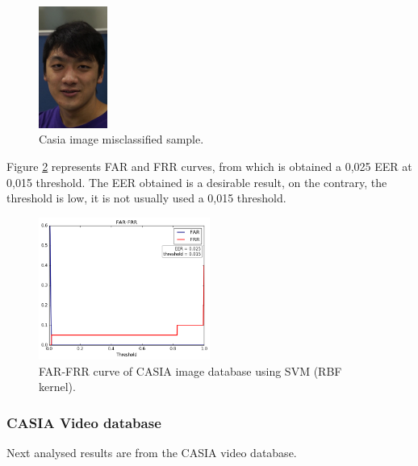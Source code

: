 \begin{figure}[htb]
\centering
\includegraphics[width=0.2\textwidth]{images_databases/casia_real_41.jpg}
\caption{Casia image misclassified sample.} \label{fig:casia_im_miscl}
\end{figure}

Figure \ref{fig:CASIA_im_FAR_FRR} represents  FAR and FRR curves, from which is obtained a 0,025 EER at 0,015 threshold. The EER obtained is a desirable result, on the contrary, the threshold is low, it is not usually used a 0,015 threshold.

\begin{figure}[htb]
\centering
\includegraphics[width=0.5\textwidth]{images/FAR-FRR/CASIA_im_SVM_RBF_FAR_FRR.png}
\caption{FAR-FRR curve of CASIA image database using SVM (RBF kernel).} \label{fig:CASIA_im_FAR_FRR}
\end{figure}


\subsubsection{CASIA Video database}
Next analysed results are from the CASIA video database.\\

